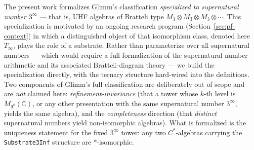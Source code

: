 \documentclass[11pt,a4paper]{article}
\theoremstyle{plain}
\theoremstyle{definition}
\begin{document}
The present work formalizes Glimm's classification \emph{specialized to supernatural number $3^{\infty}$} --- that is, UHF algebras of Bratteli type $M_3 \otimes M_3 \otimes M_3 \otimes \cdots$. This specialization is motivated by an ongoing research program (Section~\ref{sec:pf-context}) in which a distinguished object of that isomorphism class, denoted here $T_{\infty}$, plays the role of a substrate. Rather than parameterize over all supernatural numbers --- which would require a full formalization of the supernatural-number arithmetic and its associated Bratteli-diagram theory --- we build the specialization directly, with the ternary structure hard-wired into the definitions. Two components of Glimm's full classification are deliberately out of scope and are \emph{not} claimed here: \emph{refinement-invariance} (that a tower whose $k$-th level is $M_{9^k}(\mathbb{C})$, or any other presentation with the same supernatural number $3^{\infty}$, yields the same algebra), and the \emph{completeness} direction (that \emph{distinct} supernatural numbers yield non-isomorphic algebras). What is formalized is the uniqueness statement for the fixed $3^{\infty}$ tower: any two $C^{\ast}$-algebras carrying the \texttt{Substrate3Inf} structure are $\ast$-isomorphic.
\end{document}
